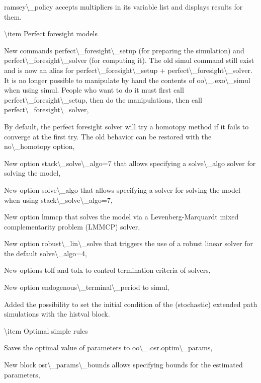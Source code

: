 \documentclass[10pt,math=newtx,citestyle=gb7714-2015,bibstyle=gb7714-2015]{elegantbook}
\begin{document}
	
	ramsey\textbackslash{}\_policy accepts multipliers in its variable list and displays results for them.
	
	\textbackslash{}item Perfect foresight models
	
	
	New commands perfect\textbackslash{}\_foresight\textbackslash{}\_setup (for preparing the simulation) and perfect\textbackslash{}\_foresight\textbackslash{}\_solver (for computing it). The old simul command still exist and is now an alias for perfect\textbackslash{}\_foresight\textbackslash{}\_setup + perfect\textbackslash{}\_foresight\textbackslash{}\_solver. It is no longer possible to manipulate by hand the contents of
	oo\textbackslash{}\_.exo\textbackslash{}\_simul when using simul. People who want to do it must first call perfect\textbackslash{}\_foresight\textbackslash{}\_setup, then do the manipulations, then call perfect\textbackslash{}\_foresight\textbackslash{}\_solver,
	
	
	By default, the perfect foresight solver will try a homotopy method if it fails to converge at the first try. The old behavior can be restored with the no\textbackslash{}\_homotopy option,
	
	
	New option stack\textbackslash{}\_solve\textbackslash{}\_algo=7 that allows specifying a solve\textbackslash{}\_algo solver for solving the model,
	
	
	New option solve\textbackslash{}\_algo that allows specifying a solver for solving the model when using stack\textbackslash{}\_solve\textbackslash{}\_algo=7,
	
	
	New option lmmcp that solves the model via a Levenberg-Marquardt mixed complementarity problem (LMMCP) solver,
	
	
	New option robust\textbackslash{}\_lin\textbackslash{}\_solve that triggers the use of a robust linear solver for the default solve\textbackslash{}\_algo=4,
	
	
	New options tolf and tolx to control termination criteria of solvers,
	
	
	New option endogenous\textbackslash{}\_terminal\textbackslash{}\_period to simul,
	
	
	Added the possibility to set the initial condition of the (stochastic) extended path simulations with the histval block.
	
	\textbackslash{}item Optimal simple rules
	
	
	Saves the optimal value of parameters to oo\textbackslash{}\_.osr.optim\textbackslash{}\_params,
	
	
	New block osr\textbackslash{}\_params\textbackslash{}\_bounds allows specifying bounds for the estimated parameters,
	
\end{document}

